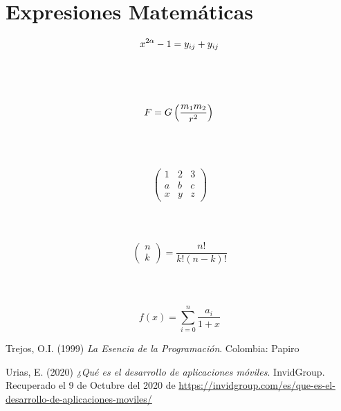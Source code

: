 \documentclass[12pt, letterpaper]{article}
\begin{document}
\section{Expresiones Matemáticas}
\[
x^{2\alpha} - 1 = y_{ij} + y_{ij}\\
\]
\\
\\
\\
\[
F = G \left(\frac{m_{1}m_{2}}{r^2}\right)\\
\]
\\
\\
\\
\begin{equation*}
  \begin{pmatrix}
    1 & 2 & 3\\
    a & b & c\\
    x & y & z
  \end{pmatrix}
\end{equation*}
\\
\\
\\
\begin{equation*}
\begin{pmatrix}
  n\\
  k
\end{pmatrix} = \frac{n!}{k!(n-k)!}
\end{equation*}
\\
\\
\\
\[
f(x) = \displaystyle\sum_{i=0}^n \frac{a_i}{1+x}
\]
\newpage

\begin{thebibliography}{x}

  Trejos, O.I. (1999)
  \textit{La Esencia de la Programación}. Colombia: Papiro

  Urias, E. (2020)
  \textit{¿Qué es el desarrollo de aplicaciones móviles}. InvidGroup. Recuperado el 9 de Octubre del 2020 de \url{https://invidgroup.com/es/que-es-el-desarrollo-de-aplicaciones-moviles/}
\end{thebibliography}
\end{document}

